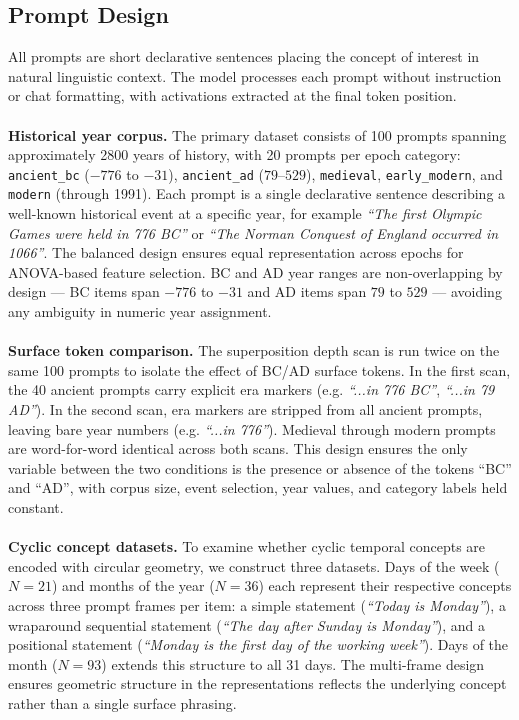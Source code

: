\documentclass[11pt]{article}
\begin{document}
\subsection{Prompt Design}

All prompts are short declarative sentences placing the concept of interest 
in natural linguistic context. The model processes each prompt without 
instruction or chat formatting, with activations extracted at the final 
token position.
\\
\\
\noindent
\textbf{Historical year corpus.} The primary dataset consists of 100 prompts spanning approximately 2800 years of history, with 20 prompts per epoch 
category: \texttt{ancient\_bc} ($-776$ to $-31$), \texttt{ancient\_ad} ($79$--$529$), \texttt{medieval}, \texttt{early\_modern}, and \texttt{modern} 
(through 1991). Each prompt is a single declarative sentence describing a well-known historical event at a specific year, for example \textit{``The 
first Olympic Games were held in 776 BC''} or \textit{``The Norman Conquest of England occurred in 1066''}. The balanced design ensures equal 
representation across epochs for ANOVA-based feature selection. BC and AD year ranges are non-overlapping by design --- BC items span $-776$ to $-31$ 
and AD items span $79$ to $529$ --- avoiding any ambiguity in numeric year assignment.
\\
\\
\textbf{Surface token comparison.} The superposition depth scan is run twice on the same 100 prompts to isolate the effect of BC/AD surface tokens. In the 
first scan, the 40 ancient prompts carry explicit era markers (e.g. \textit{``...in 776 BC''}, \textit{``...in 79 AD''}). In the second scan, 
era markers are stripped from all ancient prompts, leaving bare year numbers (e.g. \textit{``...in 776''}). Medieval through modern prompts are 
word-for-word identical across both scans. This design ensures the only variable between the two conditions is the presence or absence of the tokens 
``BC'' and ``AD'', with corpus size, event selection, year values, and category labels held constant.
\\
\\
\textbf{Cyclic concept datasets.} To examine whether cyclic temporal concepts are encoded with circular geometry, we construct three datasets. Days of the 
week ($N = 21$) and months of the year ($N = 36$) each represent their respective concepts across three prompt frames per item: a simple statement 
(\textit{``Today is Monday''}), a wraparound sequential statement (\textit{``The day after Sunday is Monday''}), and a positional statement 
(\textit{``Monday is the first day of the working week''}). Days of the month ($N = 93$) extends this structure to all 31 days. The multi-frame design 
ensures geometric structure in the representations reflects the underlying concept rather than a single surface phrasing.
\end{document}
